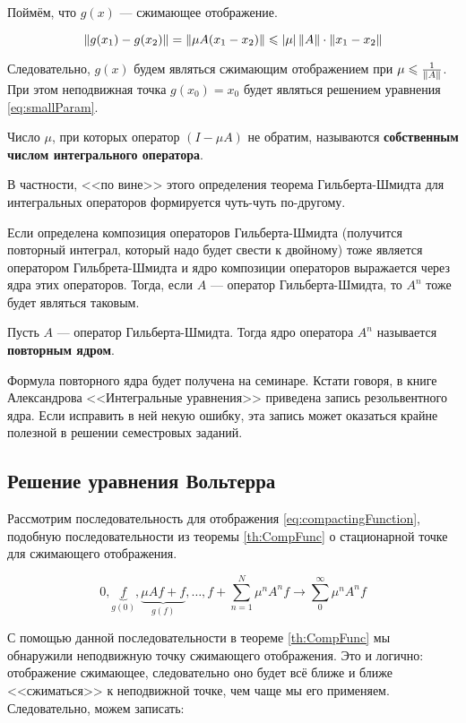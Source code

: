 \documentclass[12pt]{article}
\begin{document}
		Поймём, что $g(x)$ --- сжимающее отображение.
	
		$$\left\| g(x_1) - g(x_2) \right\| = \left\| \mu A(x_1 - x_2) \right\| \leqslant \left| \mu \right| \left\| A \right\| \cdot \left\| x_1 - x_2 \right\|$$
	
		Следовательно, $g(x)$ будем являться сжимающим отображением при $\mu \leqslant \frac{1}{\left\| A \right\|}$. При этом
		неподвижная точка $g(x_0) = x_0$ будет являться решением уравнения \eqref{eq:smallParam}.
	
		\begin{defi}
			Число $\mu$, при которых оператор $(I - \mu A)$ не обратим, называются \textbf{собственным числом
			интегрального оператора}.
		\end{defi}
	
		В частности, <<по вине>> этого определения теорема Гильберта-Шмидта для интегральных операторов формируется
		чуть-чуть по-другому.
	
		Если определена композиция операторов Гильберта-Шмидта (получится повторный интеграл, который надо будет 
		свести к двойному) тоже является оператором Гильбрета-Шмидта и ядро композиции операторов выражается 
		через ядра этих операторов. Тогда, если $A$ --- оператор Гильберта-Шмидта, то $A^n$ тоже будет являться
		таковым.
	
		\begin{defi}
			Пусть $A$ --- оператор Гильберта-Шмидта. Тогда ядро оператора $A^n$ называется \textbf{повторным ядром}.
		\end{defi}
	
		{\footnotesize
		Формула повторного ядра будет получена на семинаре. Кстати говоря, в книге Александрова <<Интегральные уравнения>>
		приведена запись резольвентного ядра. Если исправить в ней некую ошибку, эта запись может оказаться крайне полезной
		в решении семестровых заданий.\par
		}

	\subsection{Решение уравнения Вольтерра}

		Рассмотрим последовательность для отображения \eqref{eq:compactingFunction}, подобную последовательности
		из теоремы \eqref{th:CompFunc} о стационарной точке для сжимающего отображения.
	
		$$0, \underbrace{f}_{g(0)}, \underbrace{\mu Af + f}_{g(f)}, \ldots, f + \sum_{n=1}^N \mu^nA^nf \rightarrow \sum_0^{\infty} \mu^nA^n f$$

		С помощью данной последовательности в теореме \eqref{th:CompFunc} мы обнаружили неподвижную точку
		сжимающего отображения. {\color{gray} Это и логично: отображение сжимающее, следовательно оно будет
		всё ближе и ближе <<сжиматься>> к неподвижной точке, чем чаще мы его применяем.} Следовательно, можем
		записать:
\end{document}
